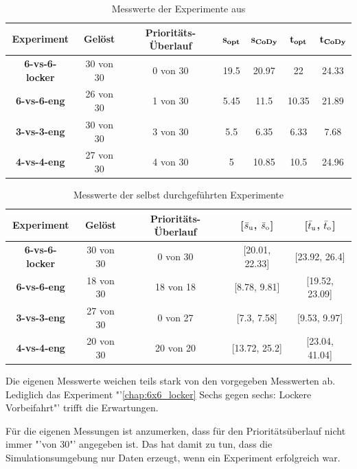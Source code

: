 \begin{table}[H]
    \centering
    \begin{tabular}{c|c|c|c|c|c|c}
       \textbf{Experiment} & \textbf{Gelöst} & \textbf{Prioritäts-Überlauf}
        & \(\textbf{s\textsubscript{opt}}\) & \(\textbf{s\textsubscript{CoDy}}\)
        & \(\textbf{t\textsubscript{opt}}\) & \(\textbf{t\textsubscript{CoDy}}\)\\ \hline
       \textbf{6-vs-6-locker} & 30 von 30 & 0 von 30
       & 19.5 & 20.97 & 22 & 24.33 \\ \hline
       \textbf{6-vs-6-eng} & 26 von 30 & 1 von 30
       & 5.45 & 11.5 & 10.35 & 21.89 \\ \hline
       \textbf{3-vs-3-eng} & 30 von 30 & 3 von 30
       & 5.5 & 6.35 & 6.33 & 7.68 \\ \hline
       \textbf{4-vs-4-eng} & 27 von 30 & 4 von 30
       & 5 & 10.85 & 10.5 & 24.96
    \end{tabular}
    \caption{Messwerte der Experimente aus \cite{book:regele}}
    \label{tab:resultsCoDy}
\end{table}

\begin{table}[H]
    \centering
    \begin{tabular}{c|c|c|c|c}
       \textbf{Experiment} & \textbf{Gelöst} & \textbf{Prioritäts-Überlauf}
        & [\textbf{\(\bar{s}\textsubscript{u}\)}, \textbf{\(\bar{s}\textsubscript{o}\)}]
        & [\textbf{\(\bar{t}\textsubscript{u}\)}, \textbf{\(\bar{t}\textsubscript{o}\)}]\\ \hline
       \textbf{6-vs-6-locker} & 30 von 30 & 0 von 30 & [20.01, 22.33] & [23.92, 26.4]\\ \hline
       \textbf{6-vs-6-eng} & 18 von 30 & 18 von 18 & [8.78, 9.81] & [19.52, 23.09]\\ \hline
       \textbf{3-vs-3-eng} & 27 von 30 & 0 von 27 & [7.3, 7.58] & [9.53, 9.97]\\ \hline
       \textbf{4-vs-4-eng} & 20 von 30 & 20 von 20 & [13.72, 25.2] & [23.04, 41.04]
    \end{tabular}
    \caption{Messwerte der selbst durchgeführten Experimente}
    \label{tab:myResults}
\end{table}

Die eigenen Messwerte weichen teils stark von den vorgegeben Messwerten ab. Lediglich das Experiment "'\ref{chap:6x6_locker} Sechs gegen sechs: Lockere Vorbeifahrt"' trifft die Erwartungen.

Für die eigenen Messungen ist anzumerken, dass für den Prioritätsüberlauf nicht immer "'von 30"' angegeben ist. Das hat damit zu tun, dass die Simulationsumgebung nur Daten erzeugt, wenn ein Experiment erfolgreich war.

